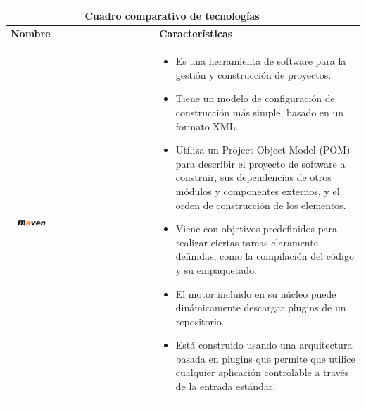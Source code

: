 \begin{table}[b!]
    \centering
    \vspace{-30mm}
      \begin{tabular}{|p{2cm}|ll}
        \hline
        
        \multicolumn{2}{|c|}{{\bf Cuadro comparativo de tecnologías}} \\ 
        \hline
          \multicolumn{1}{|p{4cm}|}{{\bf Nombre}} & 
		  \multicolumn{1}{p{10cm}|}{{\bf Características}}\\

        \hline
          \multicolumn{1}{|p{5cm}|}{\includegraphics[width=0.3\textwidth]{images/maven}} & 
          \multicolumn{2}{p{10cm}|}{\begin{itemize}
          \vspace{-10mm}
        \item Es una herramienta de software para la gestión y construcción de proyectos.
        \item Tiene un modelo de configuración de construcción más simple, basado en un formato XML.
        \item Utiliza un Project Object Model (POM) para describir el proyecto de software a construir, sus dependencias de otros 				módulos y componentes externos, y el orden de construcción de los elementos.
        \item  Viene con objetivos predefinidos para realizar ciertas tareas claramente definidas, como la compilación del código y su 		empaquetado.
        \item El motor incluido en su núcleo puede dinámicamente descargar plugins de un repositorio.
        \item Está construido usando una arquitectura basada en plugins que permite que utilice cualquier aplicación controlable a través de la entrada estándar. 
       
      \end{itemize}} \\
         

\end{tabular}
\end{table}
